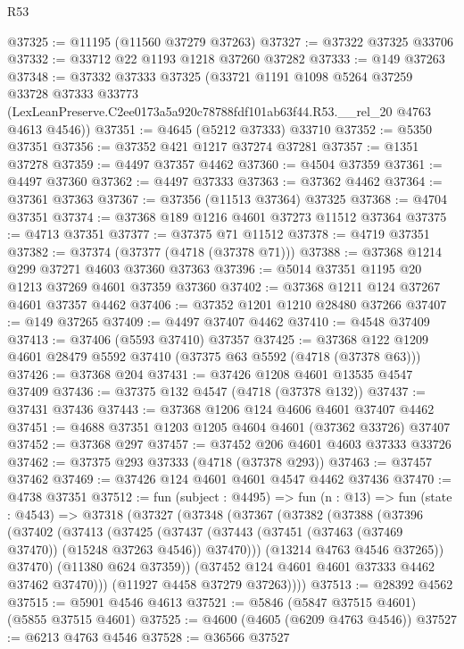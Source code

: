\begin{lexlean}{R53}
\begin{coremodule}
@37325 := @11195 (@11560 @37279 @37263)
@37327 := @37322 @37325 @33706
@37332 := @33712 @22 @1193 @1218 @37260 @37282
@37333 := @149 @37263
@37348 := @37332
    @37333
    @37325
    (@33721
      @1191
      @1098
      @5264
      @37259
      @33728
      @37333
      @33773
      (LexLeanPreserve.C2ee0173a5a920c78788fdf101ab63f44.R53.__rel_20 @4763 @4613 @4546))
@37351 := @4645 (@5212 @37333) @33710
@37352 := @5350 @37351
@37356 := @37352 @421 @1217 @37274 @37281
@37357 := @1351 @37278
@37359 := @4497 @37357 @4462
@37360 := @4504 @37359
@37361 := @4497 @37360
@37362 := @4497 @37333
@37363 := @37362 @4462
@37364 := @37361 @37363
@37367 := @37356 (@11513 @37364) @37325
@37368 := @4704 @37351
@37374 := @37368 @189 @1216 @4601 @37273 @11512 @37364
@37375 := @4713 @37351
@37377 := @37375 @71 @11512
@37378 := @4719 @37351
@37382 := @37374 (@37377 (@4718 (@37378 @71)))
@37388 := @37368 @1214 @299 @37271 @4603 @37360 @37363
@37396 := @5014 @37351 @1195 @20 @1213 @37269 @4601 @37359 @37360
@37402 := @37368 @1211 @124 @37267 @4601 @37357 @4462
@37406 := @37352 @1201 @1210 @28480 @37266
@37407 := @149 @37265
@37409 := @4497 @37407 @4462
@37410 := @4548 @37409
@37413 := @37406 (@5593 @37410) @37357
@37425 := @37368 @122 @1209 @4601 @28479 @5592 @37410 (@37375 @63 @5592 (@4718 (@37378 @63)))
@37426 := @37368 @204
@37431 := @37426 @1208 @4601 @13535 @4547 @37409
@37436 := @37375 @132 @4547 (@4718 (@37378 @132))
@37437 := @37431 @37436
@37443 := @37368 @1206 @124 @4606 @4601 @37407 @4462
@37451 := @4688 @37351 @1203 @1205 @4604 @4601 (@37362 @33726) @37407
@37452 := @37368 @297
@37457 := @37452 @206 @4601 @4603 @37333 @33726
@37462 := @37375 @293 @37333 (@4718 (@37378 @293))
@37463 := @37457 @37462
@37469 := @37426 @124 @4601 @4601 @4547 @4462 @37436
@37470 := @4738 @37351
@37512 := fun (subject : @4495) =>
  fun (n : @13) =>
  fun (state : @4543) =>
  @37318
    (@37327
      (@37348
        (@37367
          (@37382
            (@37388
              (@37396
                (@37402
                  (@37413
                    (@37425
                      (@37437
                        (@37443 (@37451 (@37463 (@37469 @37470)) (@15248 @37263 @4546)) @37470)))
                    (@13214 @4763 @4546 @37265))
                  @37470)
                (@11380 @624 @37359))
              (@37452 @124 @4601 @4601 @37333 @4462 @37462 @37470)))
          (@11927 @4458 @37279 @37263))))
@37513 := @28392 @4562
@37515 := @5901 @4546 @4613
@37521 := @5846 (@5847 @37515 @4601) (@5855 @37515 @4601)
@37525 := @4600 (@4605 (@6209 @4763 @4546))
@37527 := @6213 @4763 @4546
@37528 := @36566 @37527

\end{coremodule}
\end{lexlean}
